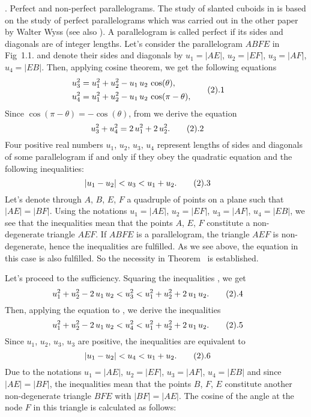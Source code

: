 . Perfect and non-perfect parallelograms.
\endhead
     The study of slanted cuboids in  is based on the study of perfect 
parallelograms which was carried out in the other paper  by Walter Wyss 
(see also ).
 A parallelogram is called perfect if its sides and diagonals are
of integer lengths. 
\enddefinition
     Let's consider the parallelogram $ABFE$ in Fig~1.1. and denote their sides
and diagonals by $u_1=|AE|$, $u_2=|EF|$, $u_3=|AF|$, $u_4=|EB|$. Then, applying cosine
theorem, we get the following equations
$$
\hskip -2em
\aligned
&u_3^2=u_1^2+u_2^2-u_1\,u_2\,\cos(\theta),\\
&u_4^2=u_1^2+u_2^2-u_1\,u_2\,\cos(\pi-\theta),
\endaligned
\mytag{2.1}
$$
Since $\cos(\pi-\theta)=-\cos(\theta)$, from  we derive the equation
$$
\hskip -2em
u_3^2+u_4^2=2\,u_1^2+2\,u_2^2.
\mytag{2.2}
$$
 Four positive real numbers $u_1$, $u_2$, $u_3$, $u_4$ represent
lengths of sides and diagonals of some parallelogram if and only if they obey the 
quadratic equation  and the following inequalities:
$$
\hskip -2em
|u_1-u_2|<u_3<u_1+u_2. 
\mytag{2.3}
$$
\endproclaim
     Let's denote through $A$, $B$, $E$, $F$ a quadruple of points on a plane
such that $|AE|=|BF|$. Using the notations $u_1=|AE|$, $u_2=|EF|$, $u_3=|AF|$, 
$u_4=|EB|$, we see that the inequalities  mean that the points 
$A$, $E$, $F$ constitute a non-degenerate triangle $AEF$. If $ABFE$ is a
parallelogram, the triangle $AEF$ is non-degenerate, hence the inequalities 
 are fulfilled. As we see above, the equation  in 
this case is also fulfilled. So the necessity in Theorem~ is 
established.\par
     Let's proceed to the sufficiency. Squaring the inequalities , 
we get
$$
\hskip -2em
u_1^2+u_2^2-2\,u_1\,u_2<u_3^2<u_1^2+u_2^2+2\,u_1\,u_2. 
\mytag{2.4}
$$
Then, applying the equation  to , we derive the
inequalities 
$$
\hskip -2em
u_1^2+u_2^2-2\,u_1\,u_2<u_4^2<u_1^2+u_2^2+2\,u_1\,u_2. 
\mytag{2.5}
$$
Since $u_1$, $u_2$, $u_3$, $u_3$ are positive, the inequalities  
are equivalent to
$$
\hskip -2em
|u_1-u_2|<u_4<u_1+u_2. 
\mytag{2.6}
$$
Due to the notations $u_1=|AE|$, $u_2=|EF|$, $u_3=|AF|$, $u_4=|EB|$ and since
$|AE|=|BF|$, the inequalities  mean that the points 
$B$, $F$, $E$ constitute another non-degenerate triangle $BFE$ with $|BF|=|AE|$. 
The cosine of the angle at the node $F$ in this triangle is calculated as follows:

